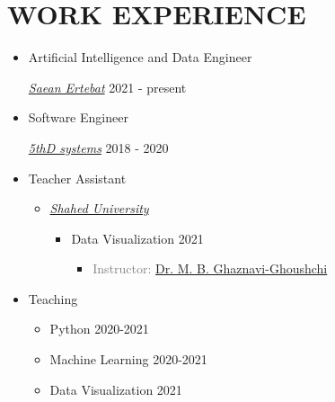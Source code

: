 \documentclass[10pt,a4paper,sans]{moderncv} %
\begin{document}
	\section{WORK EXPERIENCE}
	\vspace{0.3em}
	\begin{itemize}
		\item Artificial Intelligence and Data Engineer
		\begin{itemize}
    		\href{http://www.senatelecom.com/}{ \emph{Saean Ertebat}} \hfill 2021 - present
    	\end{itemize}
    \end{itemize}
	\begin{itemize}
		\item Software Engineer
		\begin{itemize}
    		\href{https://www.5thdsystems.com/}{ \emph{5thD systems}} \hfill 2018 - 2020
    	\end{itemize}
    \end{itemize}
	\begin{itemize}
		\item Teacher Assistant
		\begin{itemize}
    		\item \href{http://shahed.ac.ir/pages/home.aspx}{ \emph{Shahed University}}
    		
			\begin{itemize}
			    \item Data Visualization \hfill 2021
    			\begin{itemize}
    				\item \textcolor{gray}{Instructor: \href{mailto:ghaznavi@shahed.ac.ir}{Dr. M. B. Ghaznavi-Ghoushchi}}
    			\end{itemize}
    		\end{itemize}

		\end{itemize}
	\end{itemize}
	\begin{itemize}
		\item Teaching
		\begin{itemize}
			\item Python \hfill 2020-2021
			\item Machine Learning \hfill 2020-2021
			\item Data Visualization \hfill  2021
		\end{itemize}
    \end{itemize}
\end{document}
